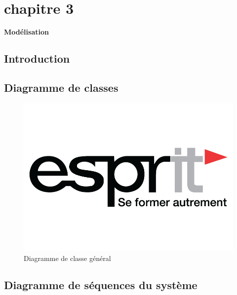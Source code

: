 
\chapter*{chapitre 3}

\textbf{\Huge Modélisation}

\setcounter{chapter}{3}
\setcounter{section}{0}

\section{Introduction}



\section{Diagramme de classes}

\begin{figure}[h!]
	\centering
	\includegraphics[width=13.5cm]{resources/images/logo.png}
	\caption{Diagramme de classe général}
	\label{011}
\end{figure}

\section{Diagramme de séquences du système}
